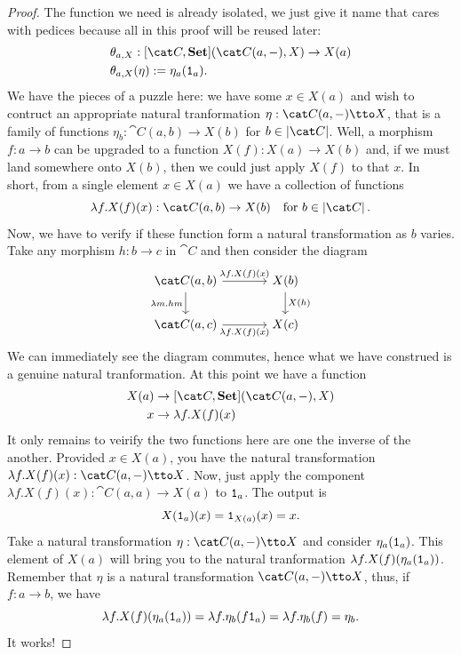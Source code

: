 \begin{proof}
  The function we need is already isolated, we just give it name that
  cares with pedices because all in this proof will be reused later:
  \begin{align*}
    & \theta_{a, X} : [\cat C, \Set](\cat C(a, -), X) \to X(a) \\
    & \theta_{a, X}(\eta) := \eta_a(\id_a) .
  \end{align*}
  We have the pieces of a puzzle here: we have some \(x \in X(a)\) and
  wish to contruct an appropriate natural tranformation
  \(\eta : \cat C(a, -) \tto X\), that is a family of functions
  \(\eta_b : \cat C(a, b) \to X(b)\) for \(b \in \obj{\cat C}\). Well, a
  morphism \(f : a \to b\) can be upgraded to a function
  \(X(f) : X(a) \to X(b)\) and, if we must land somewhere onto \(X(b)\),
  then we could just apply \(X(f)\) to that \(x\). In short, from a
  single element \(x \in X(a)\) we have a collection of functions
  \[
    \lambda f . X(f)(x) : \cat C(a, b) \to X(b) \quad \text{for } b \in \obj{\cat C} .
  \]
  Now, we have to verify if these function form a natural transformation
  as \(b\) varies. Take any morphism \(h : b \to c\) in \(\cat C\) and
  then consider the diagram
  \[
    \begin{tikzcd}[column sep=large]
      \cat C(a, b) \ar["{\lambda m . hm}", d, swap] \ar["{\lambda f . X(f)(x)}", r] & X(b) \ar["{X(h)}", d] \\
      \cat C(a, c) \ar["{\lambda f . X(f)(x)}", r, swap] & X(c)
    \end{tikzcd}
  \]
  We can immediately see the diagram commutes, hence what we have
  construed is a genuine natural tranformation. At this point we have a
  function
  \begin{align*}
    X(a) &\to [\cat C, \Set](\cat C(a, -), X) \\
    x    &\to \lambda f . X(f)(x)
  \end{align*}
  It only remains to veirify the two functions here are one the inverse
  of the another. Provided \(x \in X(a)\), you have the natural
  transformation \(\lambda f . X(f)(x) : \cat C(a, -) \tto X\). Now, just
  apply the component \(\lambda f . X(f)(x) : \cat C(a, a) \to X(a)\) to
  \(\mathtt 1_a\). The output is
  \[
    X(\mathtt 1_a)(x) = \mathtt 1_{X(a)} (x) = x .
  \]
  Take a natural transformation \(\eta : \cat C(a, -) \tto X\) and consider
  \(\eta_a (\mathtt 1_a)\). This element of \(X(a)\) will bring you to the
  natural tranformation \(\lambda f . X(f) (\eta_a(\mathtt 1_a))\). Remember that
  \(\eta\) is a natural transformation \(\cat C (a, -) \tto X\), thus, if
  \(f : a \to b\), we have
  \[
    \lambda f . X(f)(\eta_a(\mathtt 1_a)) = \lambda f . \eta_b(f\mathtt 1_a) = \lambda f . \eta_b (f) = \eta_b .
  \]
  It works!
\end{proof}

